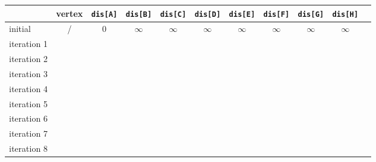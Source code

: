 \begin{table}[htbp]
    \begin{center}  
        \begin{tabular}{|l|c|c|c|c|c|c|c|c|c| p{3cm}|}  
            \hline  
            & vertex & \texttt{dis[A]} & \texttt{dis[B]} & \texttt{dis[C]} & \texttt{dis[D]} & \texttt{dis[E]} & \texttt{dis[F]} & \texttt{dis[G]} & \texttt{dis[H]}\\ \hline  
            initial 	& / & 0 &$\infty$&$\infty$&$\infty$&$\infty$&$\infty$&$\infty$&$\infty$\\ \hline
            
            iteration 1 & & & & & & & & & \\ \hline    
            iteration 2 & & & & & & & & & \\ \hline    
            iteration 3 & & & & & & & & & \\ \hline    
            iteration 4 & & & & & & & & & \\ \hline    
            iteration 5 & & & & & & & & & \\ \hline    
            iteration 6 & & & & & & & & & \\ \hline    
            iteration 7 & & & & & & & & & \\ \hline    
            iteration 8 & & & & & & & & & \\ \hline    
            
            
        \end{tabular}  
    \end{center}  
\end{table}
